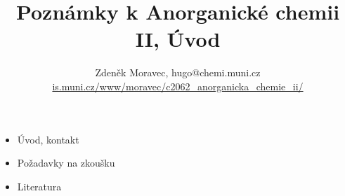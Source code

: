 \documentclass[17pt,a4paper,twoside]{extarticle}
\begin{document}
\title{Poznámky k Anorganické chemii II, Úvod}
\author{Zdeněk Moravec, hugo@chemi.muni.cz \\
		\href{https://is.muni.cz/www/moravec/c2062_anorganicka_chemie_ii/}{is.muni.cz/www/moravec/c2062\_anorganicka\_chemie\_ii/}}

\maketitle

\clearpage

\begin{itemize}
	\item Úvod, kontakt
	\item Požadavky na zkoušku
	\item Literatura
\end{itemize}
\end{document}
